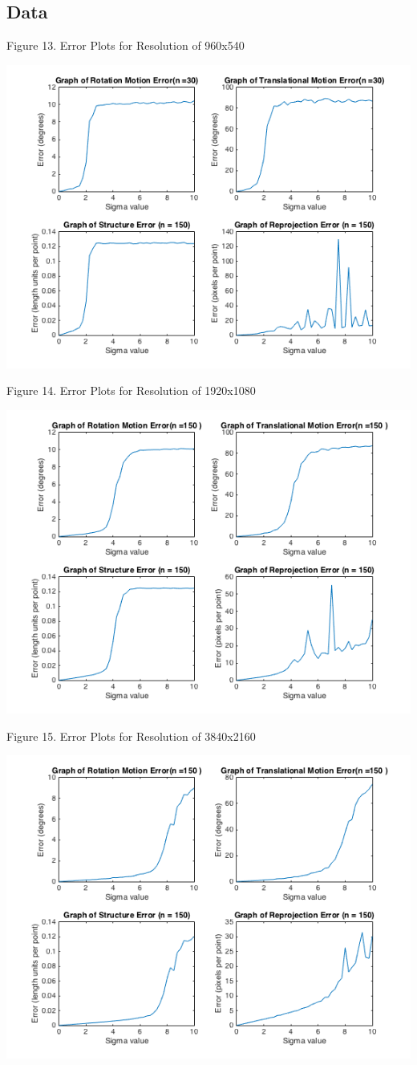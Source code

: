 \documentclass{article}
\begin{document}
\subsection{Data}
\begin{center}
	\begin{center}Figure 13. Error Plots for Resolution of 960x540\end{center}
	\includegraphics[width=.7\textwidth,keepaspectratio]{960x540_error_plots.png}
	
	\begin{center}Figure 14. Error Plots for Resolution of 1920x1080\end{center}
	\includegraphics[width=.7\textwidth,keepaspectratio]{1920x1080_error_plots.png}
	
	\begin{center}Figure 15. Error Plots for Resolution of 3840x2160\end{center}
	\includegraphics[width=.7\textwidth,keepaspectratio]{3840x2160_error_plots.png}


\end{center}
\end{document}

